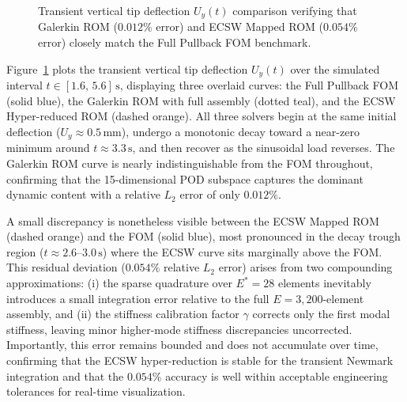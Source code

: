 \begin{figure}[htbp]
    \caption{Transient vertical tip deflection $U_y(t)$ comparison verifying that Galerkin ROM ($0.012\%$ error) and ECSW Mapped ROM ($0.054\%$ error) closely match the Full Pullback FOM benchmark.}
    \label{fig:ecsw_deflection_plot}
\end{figure}

Figure~\ref{fig:ecsw_deflection_plot} plots the transient vertical tip deflection $U_y(t)$ over the simulated interval $t \in [1.6,\,5.6]\,\text{s}$, displaying three overlaid curves: the Full Pullback FOM (solid blue), the Galerkin ROM with full assembly (dotted teal), and the ECSW Hyper-reduced ROM (dashed orange). All three solvers begin at the same initial deflection ($U_y \approx 0.5\,\text{mm}$), undergo a monotonic decay toward a near-zero minimum around $t \approx 3.3\,\text{s}$, and then recover as the sinusoidal load reverses. The Galerkin ROM curve is nearly indistinguishable from the FOM throughout, confirming that the 15-dimensional POD subspace captures the dominant dynamic content with a relative $L_2$ error of only $0.012\%$.

A small discrepancy is nonetheless visible between the ECSW Mapped ROM (dashed orange) and the FOM (solid blue), most pronounced in the decay trough region ($t \approx 2.6$–$3.0\,\text{s}$) where the ECSW curve sits marginally above the FOM. This residual deviation ($0.054\%$ relative $L_2$ error) arises from two compounding approximations: (i) the sparse quadrature over $E^* = 28$ elements inevitably introduces a small integration error relative to the full $E = 3{,}200$-element assembly, and (ii) the stiffness calibration factor $\gamma$ corrects only the first modal stiffness, leaving minor higher-mode stiffness discrepancies uncorrected. Importantly, this error remains bounded and does not accumulate over time, confirming that the ECSW hyper-reduction is stable for the transient Newmark integration and that the $0.054\%$ accuracy is well within acceptable engineering tolerances for real-time visualization.


